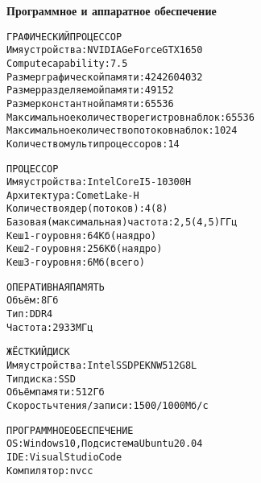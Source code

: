 \textbf{\large Программное и аппаратное обеспечение}

\vspace{-20pt}
\begin{alltt}
\normalfont
ГРАФИЧЕСКИЙ ПРОЦЕССОР
Имя устройства: NVIDIA GeForce GTX 1650
Compute capability: 7.5
Размер графической памяти: 4242604032 
Размер разделяемой памяти: 49152
Размер константной памяти: 65536 
Максимальное количество регистров на блок: 65536 
Максимальное количество потоков на блок: 1024 
Количество мультипроцессоров: 14

ПРОЦЕССОР
Имя устройства: Intel Core I5-10300H
Архитектура: Comet Lake-H
Количество ядер (потоков): 4(8)
Базовая (максимальная) частота: 2,5(4,5)ГГц
Кеш 1-го уровня: 64Кб (на ядро)
Кеш 2-го уровня: 256Кб (на ядро)
Кеш 3-го уровня: 6Мб (всего)

ОПЕРАТИВНАЯ ПАМЯТЬ
Объём: 8Гб
Тип: DDR4
Частота:2933МГц

ЖЁСТКИЙ ДИСК
Имя устройства: Intel SSDPEKNW512G8L
Тип диска: SSD
Объём памяти: 512Гб
Скорость чтения/записи: 1500/1000 Мб/с

ПРОГРАММНОЕ ОБЕСПЕЧЕНИЕ
OS: Windows 10, Подсистема Ubuntu 20.04
IDE: Visual Studio Code
Компилятор: nvcc

\end{alltt}
\vspace{-20pt}
